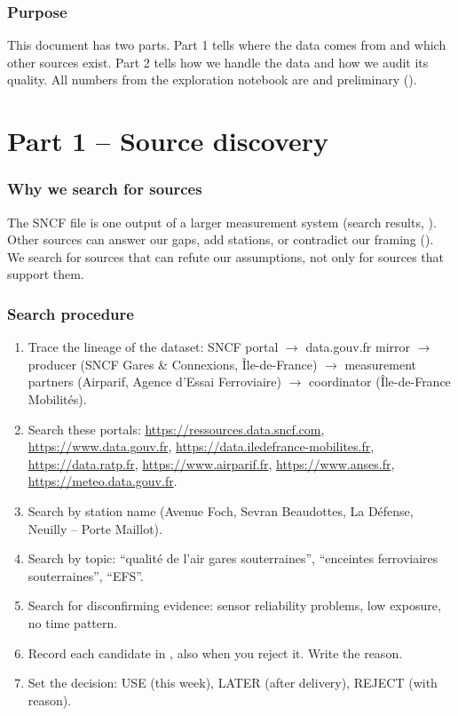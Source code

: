 \documentclass[11pt]{article}
\begin{document}
\makedoctitle
\tableofcontents
\clearpage

\section{Purpose}
This document has two parts.
Part 1 tells where the data comes from and which other sources exist.
Part 2 tells how we handle the data and how we audit its quality.
All numbers from the exploration notebook are \tObserved{} and preliminary ().

\taglegend

\part*{Part 1 -- Source discovery}

\section{Why we search for sources}
The SNCF file is one output of a larger measurement system \tSource{} (search results, ).
Other sources can answer our gaps, add stations, or contradict our framing ().
We search for sources that can refute our assumptions, not only for sources that support them.

\section{Search procedure}
\begin{enumerate}
  \item Trace the lineage of the dataset: SNCF portal $\rightarrow$ data.gouv.fr mirror $\rightarrow$ producer (SNCF Gares \& Connexions, Île-de-France) $\rightarrow$ measurement partners (Airparif, Agence d'Essai Ferroviaire) $\rightarrow$ coordinator (Île-de-France Mobilités).
  \item Search these portals: \url{https://ressources.data.sncf.com}, \url{https://www.data.gouv.fr}, \url{https://data.iledefrance-mobilites.fr}, \url{https://data.ratp.fr}, \url{https://www.airparif.fr}, \url{https://www.anses.fr}, \url{https://meteo.data.gouv.fr}.
  \item Search by station name (Avenue Foch, Sevran Beaudottes, La Défense, Neuilly -- Porte Maillot).
  \item Search by topic: ``qualité de l'air gares souterraines'', ``enceintes ferroviaires souterraines'', ``EFS''.
  \item Search for disconfirming evidence: sensor reliability problems, low exposure, no time pattern.
  \item Record each candidate in , also when you reject it. Write the reason.
  \item Set the decision: USE (this week), LATER (after delivery), REJECT (with reason).
\end{enumerate}
\end{document}
